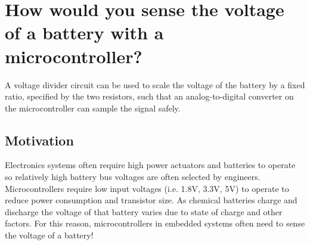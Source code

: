\documentclass[main.tex]{subfiles}
\begin{document}
\section{How would you sense the voltage of a battery with a microcontroller?}

\noindent A voltage divider circuit can be used to scale the voltage of the battery by a fixed ratio, specified by the two resistors, such that an analog-to-digital converter on the microcontroller can sample the signal safely.


\subsection{Motivation}
Electronics systems often require high power actuators and batteries to operate so relatively high battery bus voltages are often selected by engineers. Microcontrollers require low input voltages (i.e. 1.8V, 3.3V, 5V) to operate to reduce power consumption and transistor size. As chemical batteries charge and discharge the voltage of that battery varies due to state of charge and other factors. For this reason, microcontrollers in embedded systems often need to sense the voltage of a battery!
\end{document}
